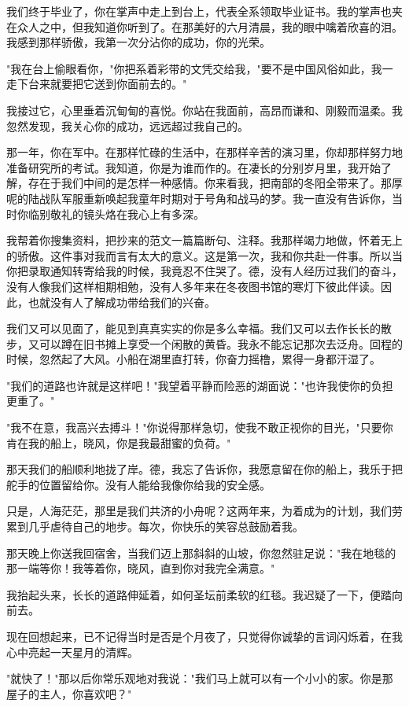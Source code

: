 \documentclass[UTF8,a4paper,8pt]{ctexart}
\begin{document}
 我们终于毕业了，你在掌声中走上到台上，代表全系领取毕业证书。我的掌声也夹在众人之中，但我知道你听到了。在那美好的六月清晨，我的眼中噙着欣喜的泪。我感到那样骄傲，我第一次分沾你的成功，你的光荣。
 
 "我在台上偷眼看你，"你把系着彩带的文凭交给我，"要不是中国风俗如此，我一走下台来就要把它送到你面前去的。"
 
 我接过它，心里垂着沉甸甸的喜悦。你站在我面前，高昂而谦和、刚毅而温柔。我忽然发现，我关心你的成功，远远超过我自己的。
 
 那一年，你在军中。在那样忙碌的生活中，在那样辛苦的演习里，你却那样努力地准备研究所的考试。我知道，你是为谁而作的。在凄长的分别岁月里，我开始了解，存在于我们中间的是怎样一种感情。你来看我，把南部的冬阳全带来了。那厚呢的陆战队军服重新唤起我童年时期对于号角和战马的梦。我一直没有告诉你，当时你临别敬礼的镜头烙在我心上有多深。
 
 我帮着你搜集资料，把抄来的范文一篇篇断句、注释。我那样竭力地做，怀着无上的骄傲。这件事对我而言有太大的意义。这是第一次，我和你共赴一件事。所以当你把录取通知转寄给我的时候，我竟忍不住哭了。德，没有人经历过我们的奋斗，没有人像我们这样相期相勉，没有人多年来在冬夜图书馆的寒灯下彼此伴读。因此，也就没有人了解成功带给我们的兴奋。
 
 我们又可以见面了，能见到真真实实的你是多么幸福。我们又可以去作长长的散步，又可以蹲在旧书摊上享受一个闲散的黄昏。我永不能忘记那次去泛舟。回程的时候，忽然起了大风。小船在湖里直打转，你奋力摇橹，累得一身都汗湿了。
 
 "我们的道路也许就是这样吧！"我望着平静而险恶的湖面说："也许我使你的负担更重了。"
 
 "我不在意，我高兴去搏斗！"你说得那样急切，使我不敢正视你的目光，"只要你肯在我的船上，晓风，你是我最甜蜜的负荷。"
 
 那天我们的船顺利地拢了岸。德，我忘了告诉你，我愿意留在你的船上，我乐于把舵手的位置留给你。没有人能给我像你给我的安全感。
 
 只是，人海茫茫，那里是我们共济的小舟呢？这两年来，为着成为的计划，我们劳累到几乎虐待自己的地步。每次，你快乐的笑容总鼓励着我。
 
 那天晚上你送我回宿舍，当我们迈上那斜斜的山坡，你忽然驻足说："我在地毯的那一端等你！我等着你，晓风，直到你对我完全满意。"
 
 我抬起头来，长长的道路伸延着，如何圣坛前柔软的红毯。我迟疑了一下，便踏向前去。
 
 现在回想起来，已不记得当时是否是个月夜了，只觉得你诚挚的言词闪烁着，在我心中亮起一天星月的清辉。
 
 "就快了！"那以后你常乐观地对我说："我们马上就可以有一个小小的家。你是那屋子的主人，你喜欢吧？"
 
\end{document}
